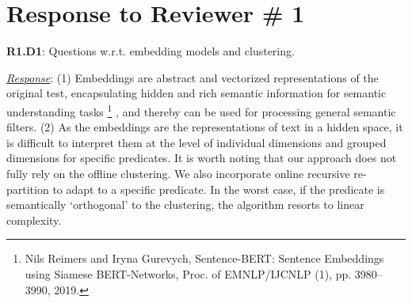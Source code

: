 \documentclass[sigconf]{acmart}
\begin{document}
\vspace{-2mm}
\section*{Response to Reviewer \# 1}
{\noindent \textbf{R1.D1}}: Questions w.r.t. embedding models and clustering. 


{\noindent \underline{\sl Response}:} (1) Embeddings are abstract and vectorized representations of the original test, encapsulating hidden and rich semantic information for semantic understanding tasks
\footnote{Nils Reimers and Iryna Gurevych, Sentence-BERT: Sentence Embeddings using Siamese BERT-Networks, Proc. of EMNLP/IJCNLP (1), pp. 3980–3990, 2019.}
, and thereby can be used for processing general semantic filters. 
(2) As the embeddings are the representations of text in a hidden space, it is difficult to interpret them at the level of individual dimensions and grouped dimensions for specific predicates. 
It is worth noting that our approach does not fully rely on the offline clustering.  We also incorporate online recursive re-partition to adapt to a specific predicate. In the worst case, if the predicate is semantically `orthogonal' to the clustering, the algorithm resorts to linear complexity.

\end{document}
